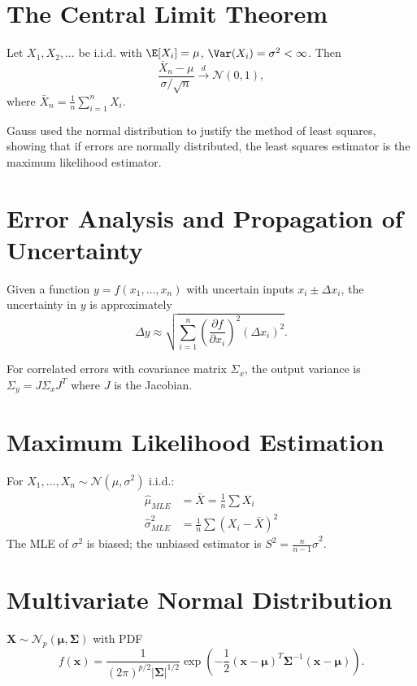 \section{The Central Limit Theorem}

\begin{theorem}
Let $X_1, X_2, \ldots$ be i.i.d. with $\E[X_i] = \mu$, $\Var(X_i) = \sigma^2 < \infty$. Then
\[
\frac{\bar{X}_n - \mu}{\sigma/\sqrt{n}} \xrightarrow{d} \mathcal{N}(0,1),
\]
where $\bar{X}_n = \frac{1}{n}\sum_{i=1}^n X_i$.
\end{theorem}

Gauss used the normal distribution to justify the method of least squares, showing that if errors are normally distributed, the least squares estimator is the maximum likelihood  estimator.

\section{Error Analysis and Propagation of Uncertainty}

Given a function $y = f(x_1, \ldots, x_n)$ with uncertain inputs $x_i \pm \Delta x_i$, the uncertainty in $y$ is approximately
\[
\Delta y \approx \sqrt{\sum_{i=1}^n \left(\frac{\partial f}{\partial x_i}\right)^2 (\Delta x_i)^2}.
\]

For correlated errors with covariance matrix  $\Sigma_x$, the output variance is $\Sigma_y = J \Sigma_x J^T$ where $J$ is the Jacobian.

\section{Maximum Likelihood Estimation}

For $X_1, \ldots, X_n \sim \mathcal{N}(\mu, \sigma^2)$ i.i.d.:
\begin{align*}
\hat{\mu}_{MLE} &= \bar{X} = \frac{1}{n}\sum X_i \\
\hat{\sigma}^2_{MLE} &= \frac{1}{n}\sum (X_i - \bar{X})^2
\end{align*}
The MLE of $\sigma^2$ is biased; the unbiased estimator is $S^2 = \frac{n}{n-1}\hat{\sigma}^2$.

\section{Multivariate Normal Distribution}

$\mathbf{X} \sim \mathcal{N}_p(\boldsymbol{\mu}, \boldsymbol{\Sigma})$ with PDF
\[
f(\mathbf{x}) = \frac{1}{(2\pi)^{p/2} |\boldsymbol{\Sigma}|^{1/2}} \exp\left(-\frac{1}{2}(\mathbf{x}-\boldsymbol{\mu})^T \boldsymbol{\Sigma}^{-1} (\mathbf{x}-\boldsymbol{\mu})\right).
\]

